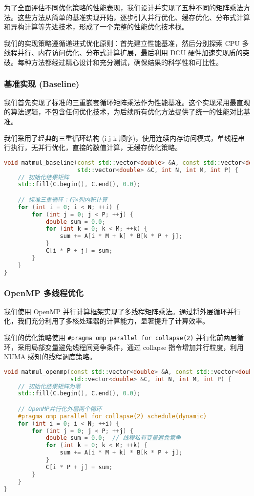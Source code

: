 \documentclass[12pt,a4paper]{article}
\begin{document}
为了全面评估不同优化策略的性能表现，我们设计并实现了五种不同的矩阵乘法方法。这些方法从简单的基准实现开始，逐步引入并行优化、缓存优化、分布式计算和异构计算等先进技术，形成了一个完整的性能优化技术栈。

我们的实现策略遵循递进式优化原则：首先建立性能基准，然后分别探索 CPU 多线程并行、内存访问优化、分布式计算扩展，最后利用 DCU 硬件加速实现质的突破。每种方法都经过精心设计和充分测试，确保结果的科学性和可比性。

\subsubsection{基准实现 (Baseline)}

我们首先实现了标准的三重嵌套循环矩阵乘法作为性能基准。这个实现采用最直观的算法逻辑，不包含任何优化技术，为后续所有优化方法提供了统一的性能对比基准。

我们采用了经典的三重循环结构 (i-j-k 顺序)，使用连续内存访问模式，单线程串行执行，无并行优化，直接的数值计算，无缓存优化策略。

\begin{lstlisting}[language=c++,caption=基准矩阵乘法实现]
void matmul_baseline(const std::vector<double> &A, const std::vector<double> &B,
                     std::vector<double> &C, int N, int M, int P) {
    // 初始化结果矩阵
    std::fill(C.begin(), C.end(), 0.0);

    // 标准三重循环：行×列内积计算
    for (int i = 0; i < N; ++i) {
        for (int j = 0; j < P; ++j) {
            double sum = 0.0;
            for (int k = 0; k < M; ++k) {
                sum += A[i * M + k] * B[k * P + j];
            }
            C[i * P + j] = sum;
        }
    }
}
\end{lstlisting}

\subsubsection{OpenMP 多线程优化}

我们使用 OpenMP 并行计算框架实现了多线程矩阵乘法。通过将外层循环并行化，我们充分利用了多核处理器的计算能力，显著提升了计算效率。

我们的优化策略使用 \texttt{\#pragma omp parallel for collapse(2)} 并行化前两层循环，采用局部变量避免线程间竞争条件，通过 collapse 指令增加并行粒度，利用 NUMA 感知的线程调度策略。

\begin{lstlisting}[language=c++,caption=OpenMP多线程矩阵乘法]
void matmul_openmp(const std::vector<double> &A, const std::vector<double> &B,
                   std::vector<double> &C, int N, int M, int P) {
    // 初始化结果矩阵为零
    std::fill(C.begin(), C.end(), 0.0);

    // OpenMP并行化外层两个循环
    #pragma omp parallel for collapse(2) schedule(dynamic)
    for (int i = 0; i < N; ++i) {
        for (int j = 0; j < P; ++j) {
            double sum = 0.0;  // 线程私有变量避免竞争
            for (int k = 0; k < M; ++k) {
                sum += A[i * M + k] * B[k * P + j];
            }
            C[i * P + j] = sum;
        }
    }
}
\end{lstlisting}
\end{document}
